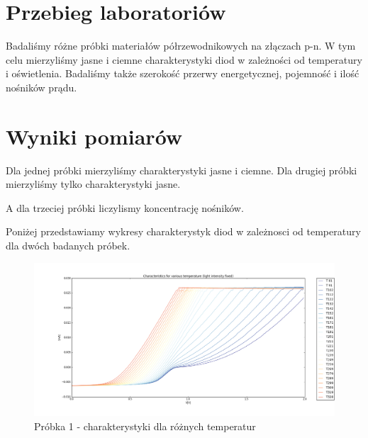 \documentclass[a4paper,12pt]{article}
\begin{document}
\section{Przebieg laboratoriów}
Badaliśmy różne próbki materiałów półrzewodnikowych na złączach p-n. W tym celu mierzyliśmy jasne i ciemne charakterystyki diod w zależności od temperatury i oświetlenia. Badaliśmy także szerokość przerwy energetycznej, pojemność i ilość nośników prądu. 


\section{Wyniki pomiarów}

Dla jednej próbki mierzyliśmy charakterystyki jasne i ciemne.
Dla drugiej próbki mierzyliśmy tylko charakterystyki jasne.

A dla trzeciej próbki liczylismy koncentrację nośników.

Poniżej przedstawiamy wykresy charakterystyk diod w zależnosci od temperatury dla dwóch badanych próbek.

\begin{figure} [H]
  \begin{center}
    \includegraphics[width = 15cm]{probka1_temperatura.png}
    \caption{Próbka 1 - charakterystyki dla różnych temperatur}
  \end{center}
\end{figure}
\end{document}
